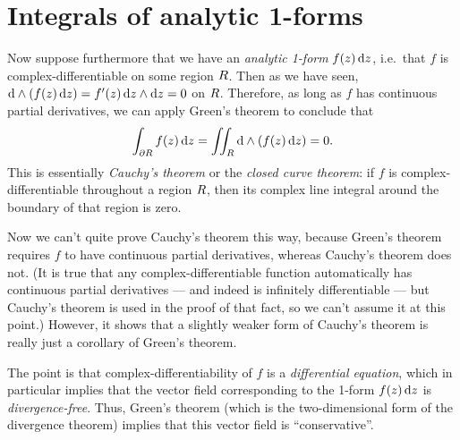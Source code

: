 \documentclass[12pt]{amsart}
\begin{document}
\section{Integrals of analytic 1-forms}
\label{sec:integrals-of-analytic-1forms}

Now suppose furthermore that we have an \emph{analytic 1-form} $f(z) \,{\mathrm{d} z}$, i.e.\ that $f$ is complex-differentiable on some region $R$.
Then as we have seen, $\mathrm{d}\wedge(f(z)\,{\mathrm{d} z}) = f'(z)\,{\mathrm{d} z} \wedge{\ensuremath{\mathrm{d} z}} = 0$ on $R$.
Therefore, as long as $f$ has continuous partial derivatives, we can apply Green's theorem to conclude that
\[ \int_{\partial R} f(z)\,{\mathrm{d} z} = \iint_{R} \mathrm{d}\wedge(f(z)\,{\mathrm{d} z}) = 0. \]
This is essentially \emph{Cauchy's theorem} or the \emph{closed curve theorem}: if $f$ is complex-differentiable throughout a region $R$, then its complex line integral around the boundary of that region is zero.

Now we can't quite prove Cauchy's theorem this way, because Green's theorem requires $f$ to have continuous partial derivatives, whereas Cauchy's theorem does not.
(It is true that any complex-differentiable function automatically has continuous partial derivatives --- and indeed is infinitely differentiable --- but Cauchy's theorem is used in the proof of that fact, so we can't assume it at this point.)
However, it shows that a slightly weaker form of Cauchy's theorem is really just a corollary of Green's theorem.

The point is that complex-differentiability of $f$ is a \emph{differential equation}, which in particular implies that the vector field corresponding to the 1-form $f(z)\,{\mathrm{d} z}$ is \emph{divergence-free}.
Thus, Green's theorem (which is the two-dimensional form of the divergence theorem) implies that this vector field is ``conservative''.
\end{document}
